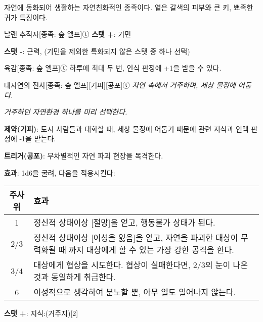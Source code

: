 \documentclass{report}
\begin{document}
	자연에 동화되어 생활하는 자연친화적인 종족이다. 옅은 갈색의 피부와 큰 키, 뾰족한 귀가 특징이다.
	
	\begin{story}{날랜 추적자}{[종족: 숲 엘프]ⓣ}
		\textbf{스탯 +}: 기민
		
		\textbf{스탯 -}: 근력, (기민을 제외한 특화되지 않은 스탯 중 하나 선택)
		
	\end{story}
	
	\begin{story}{육감}{[종족: 숲 엘프]ⓣ}
		하루에 최대 두 번, 인식 판정에 +1을 받을 수 있다.
		
	\end{story}
	
	\begin{story}{대자연의 전사}{[종족: 숲 엘프][기피][공포]ⓣ}
		\textit{자연 속에서 거주하며, 세상 물정에 어둡다.}
		
		\textit{거주하던 자연환경 하나를 미리 선택한다.}
		
		\textbf{제약(기피)}: 도시 사람들과 대화할 때, 세상 물정에 어둡기 때문에 관련 지식과 인맥 판정에 -1을 받는다.
		
		\medskip
		
		\textbf{트리거(공포)}: 무차별적인 자연 파괴 현장을 목격한다.
		
		\textbf{효과}: 1d6을 굴려, 다음을 적용시킨다:
		
		\begin{center}
			\begin{tabularx}{\textwidth}{c|X}
				\textbf{주사위} & \textbf{효과}                                        \\\hline\hline
				1               & 정신적 상태이상 [절망]을 얻고, 행동불가 상태가 된다. \\\hline
				2/3            & 정신적 상태이상 [이성을 잃음]을 얻고, 자연을 파괴한 대상이 무력화될 때 까지 대상에게 할 수 있는 가장 강한 공격을 한다. \\\hline
				3/4            & 대상에게 협상을 시도한다. 협상이 실패한다면, 2/3의 눈이 나온것과 동일하게 취급한다. \\\hline
				6               & 이성적으로 생각하여 분노할 뿐, 아무 일도 일어나지 않는다. \\
			\end{tabularx}
		\end{center}
		
		\textbf{스탯 +}: 지식:(거주지)[2]
		
	\end{story}
	
\end{document}
